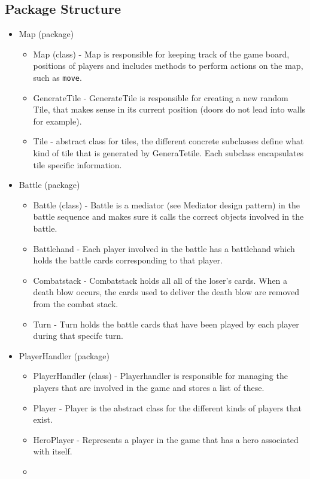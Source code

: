 \subsection{Package Structure}
\label{packagestructure}
\begin{itemize}
\item
Map (package)
	\begin{itemize}
	\item
	Map (class) - Map is responsible for keeping track of the game board, positions of players and includes methods to perform actions on the map, such as \texttt{move}.
	\item
	GenerateTile - GenerateTile is responsible for creating a new random Tile, that makes sense in its current position (doors do not lead into walls for example).
	\item
	Tile - abstract class for tiles, the different concrete subclasses define what kind of tile that is generated by GeneraTetile. Each subclass encapsulates 	 tile specific information.
	\end{itemize}
\item
Battle (package)
	\begin{itemize}
	\item
	Battle (class) - Battle is a mediator (see Mediator design pattern) in the battle sequence and makes sure it calls the correct objects involved in the battle.
	\item
	Battlehand - Each player involved in the battle has a battlehand which holds the battle cards corresponding to that player.
	\item
	Combatstack - Combatstack holds all all of the loser's cards. When a death blow occurs, the cards used to deliver the death blow are removed from the combat stack.
	\item
	Turn - Turn holds the battle cards that have been played by each player during that specifc turn.
	\end{itemize}
\item
PlayerHandler (package)
	\begin{itemize}
	\item
	PlayerHandler (class) - Playerhandler is responsible for managing the players that are involved in the game and stores a list of these.
	\item
	Player - Player is the abstract class for the different kinds of players that exist.
	\item
	HeroPlayer - Represents a player in the game that has a hero associated with itself.
	\item

\end{itemize}
\end{itemize}
